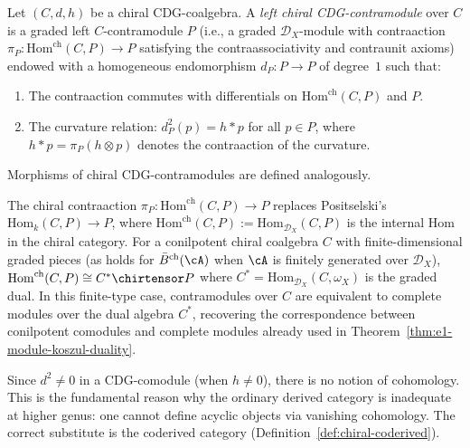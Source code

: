 \begin{definition}\label{def:chiral-CDG-contramodule}
Let $(C, d, h)$ be a chiral CDG-coalgebra.  A \emph{left chiral
CDG-contramodule} over $C$ is a graded left $C$-contramodule $P$
(i.e., a graded $\mathcal{D}_X$-module with contraaction
$\pi_P\colon \mathrm{Hom}^{\mathrm{ch}}(C, P) \to P$
satisfying the contraassociativity and contraunit axioms)
endowed with a
homogeneous endomorphism $d_P\colon P \to P$ of degree~$1$ such that:
\begin{enumerate}
\item The contraaction commutes with differentials on
  $\mathrm{Hom}^{\mathrm{ch}}(C, P)$ and $P$.
\item The curvature relation:
  $d_P^2(p) = h \ast p$ for all $p \in P$,
  where $h \ast p = \pi_P(h \otimes p)$ denotes the contraaction
  of the curvature.
\end{enumerate}
Morphisms of chiral CDG-contramodules are defined analogously.
\end{definition}

\begin{remark}
\label{rem:chiral-contramodules}
The chiral contraaction $\pi_P\colon \mathrm{Hom}^{\mathrm{ch}}(C, P) \to P$
replaces Positselski's $\mathrm{Hom}_k(C, P) \to P$, where
$\mathrm{Hom}^{\mathrm{ch}}(C, P) := \mathrm{Hom}_{\mathcal{D}_X}(C, P)$
is the internal Hom in the chiral category.  For a conilpotent chiral
coalgebra $C$ with finite-dimensional graded pieces (as holds for
$\bar{B}^{\mathrm{ch}}(\cA)$ when $\cA$ is finitely generated over $\mathcal{D}_X$),
$\mathrm{Hom}^{\mathrm{ch}}(C, P) \cong C^* \chirtensor P$
where $C^* = \mathrm{Hom}_{\mathcal{D}_X}(C, \omega_X)$ is the
graded dual.  In this finite-type case, contramodules over $C$ are
equivalent to complete modules over the dual algebra $C^*$, recovering
the correspondence between conilpotent comodules and complete modules
already used in Theorem~\ref{thm:e1-module-koszul-duality}.
\end{remark}

\begin{remark}
\label{rem:no-CDG-cohomology}
Since $d^2 \neq 0$ in a CDG-comodule (when $h \neq 0$), there is no
notion of cohomology.  This is the fundamental reason why the ordinary
derived category is inadequate at higher genus: one cannot define
acyclic objects via vanishing cohomology.  The correct
substitute is the coderived category (Definition~\ref{def:chiral-coderived}).
\end{remark}

